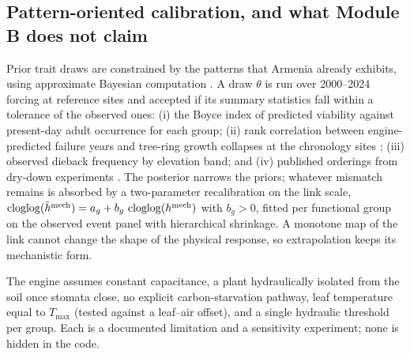 \subsection{Pattern-oriented calibration, and what Module B does not claim}\label{sec:pom}
Prior trait draws are constrained by the patterns that Armenia already exhibits, using approximate Bayesian computation \citep{Grimm2005,Beaumont2010}. A draw $\theta$ is run over 2000--2024 forcing at reference sites and accepted if its summary statistics fall within a tolerance of the observed ones: (i) the Boyce index of predicted viability against present-day adult occurrence for each group; (ii) rank correlation between engine-predicted failure years and tree-ring growth collapses at the chronology sites \citep{Voss2025,Stepanyan2026,OpalaOwczarek2021}; (iii) observed dieback frequency by elevation band; and (iv) published orderings from dry-down experiments \citep{Waite2026}. The posterior narrows the priors; whatever mismatch remains is absorbed by a two-parameter recalibration on the link scale, $\operatorname{cloglog}(\tilde h^{\text{mech}})=a_g+b_g\,\operatorname{cloglog}(h^{\text{mech}})$ with $b_g>0$, fitted per functional group on the observed event panel with hierarchical shrinkage. A monotone map of the link cannot change the shape of the physical response, so extrapolation keeps its mechanistic form.

The engine assumes constant capacitance, a plant hydraulically isolated from the soil once stomata close, no explicit carbon-starvation pathway, leaf temperature equal to $T_{\max}$ (tested against a leaf--air offset), and a single hydraulic threshold per group. Each is a documented limitation and a sensitivity experiment; none is hidden in the code.
